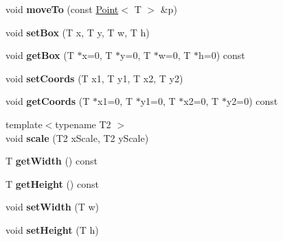 \begin{DoxyCompactItemize}
\item 
\hypertarget{class_box_a3c7f973d21b9144b2b1d5a854f2aec9b}{
void {\bfseries moveTo} (const \hyperlink{class_point}{Point}$<$ T $>$ \&p)}
\label{class_box_a3c7f973d21b9144b2b1d5a854f2aec9b}

\item 
\hypertarget{class_box_a58b4172de656a853e63734c8501ca2d3}{
void {\bfseries setBox} (T x, T y, T w, T h)}
\label{class_box_a58b4172de656a853e63734c8501ca2d3}

\item 
\hypertarget{class_box_a2a5767d016fc9a5960f3e2a3c9fa5c89}{
void {\bfseries getBox} (T $\ast$x=0, T $\ast$y=0, T $\ast$w=0, T $\ast$h=0) const }
\label{class_box_a2a5767d016fc9a5960f3e2a3c9fa5c89}

\item 
\hypertarget{class_box_a34c9185bc13058d287f762f70a44738b}{
void {\bfseries setCoords} (T x1, T y1, T x2, T y2)}
\label{class_box_a34c9185bc13058d287f762f70a44738b}

\item 
\hypertarget{class_box_a08182031d00233aa02f6b9380d213c86}{
void {\bfseries getCoords} (T $\ast$x1=0, T $\ast$y1=0, T $\ast$x2=0, T $\ast$y2=0) const }
\label{class_box_a08182031d00233aa02f6b9380d213c86}

\item 
\hypertarget{class_box_a710290e5022b29be36491593d26e938d}{
{\footnotesize template$<$typename T2 $>$ }\\void {\bfseries scale} (T2 xScale, T2 yScale)}
\label{class_box_a710290e5022b29be36491593d26e938d}

\item 
\hypertarget{class_box_a25420c9b205a53b1345ff2dce6d2f351}{
T {\bfseries getWidth} () const }
\label{class_box_a25420c9b205a53b1345ff2dce6d2f351}

\item 
\hypertarget{class_box_a4658e043d83b5360bc186a73c1859313}{
T {\bfseries getHeight} () const }
\label{class_box_a4658e043d83b5360bc186a73c1859313}

\item 
\hypertarget{class_box_a7cfb90348077f6476e5f9aa7ff8d851d}{
void {\bfseries setWidth} (T w)}
\label{class_box_a7cfb90348077f6476e5f9aa7ff8d851d}

\item 
\hypertarget{class_box_a88efe31d53ff3895a3036e7f183152d7}{
void {\bfseries setHeight} (T h)}
\label{class_box_a88efe31d53ff3895a3036e7f183152d7}


\end{DoxyCompactItemize}

